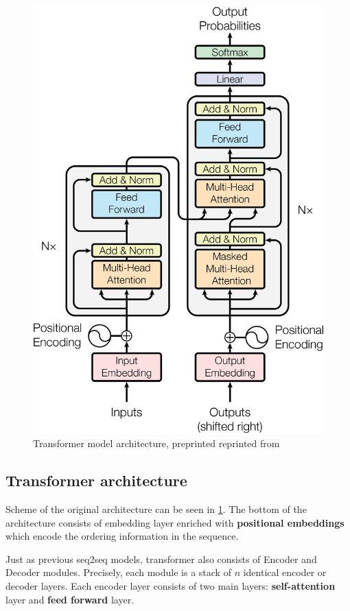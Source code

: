 \begin{figure}
  \includegraphics[scale=0.5]{my_modules/multimedia/atalyned.png}
  \caption{Transformer model architecture, preprinted reprinted from \cite{vaswani2017attention}}
  \label{fig:transformer}
\end{figure}

\subsection{Transformer architecture}
Scheme of the original architecture can be seen in \ref{fig:transformer}. The bottom of the architecture consists of embedding layer enriched with \textbf{positional embeddings} which encode the ordering information in the sequence.

Just as previous seq2seq models, transformer also consists of Encoder and Decoder modules. Precisely, each module is a stack of $n$ identical encoder or decoder layers. Each encoder layer consists of two main layers: \textbf{self-attention} layer and \textbf{feed forward} layer.

